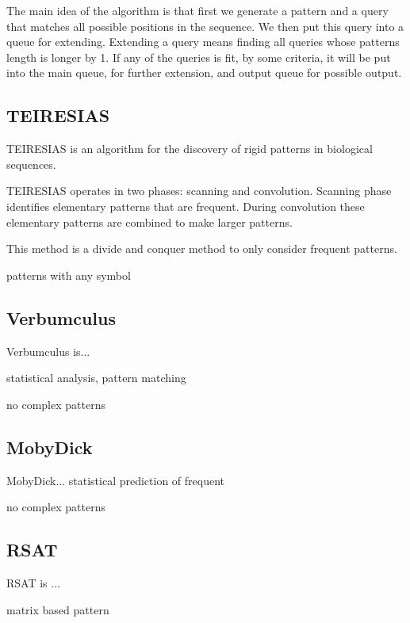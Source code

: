 The main idea of the algorithm is that first we generate a 
pattern and a query that matches all possible positions in 
the sequence. We then put this query into a queue for extending.
Extending a query means finding all queries whose patterns length
is longer by 1. If any of the queries is fit, by some criteria,
it will be put into the main queue, for further extension, 
and output queue for possible output.

\subsection{TEIRESIAS}

TEIRESIAS\cite{TEIRESIAS} is an algorithm for the discovery of rigid patterns in biological sequences. 

TEIRESIAS operates in two phases: scanning and convolution. Scanning phase identifies elementary patterns that are frequent. During convolution these elementary patterns are combined to make larger patterns.

This method is a divide and conquer method to only consider frequent patterns.

patterns with any symbol 


\subsection{Verbumculus}

Verbumculus\cite{Verbumculus} is...

statistical analysis, pattern matching

no complex patterns


\subsection{MobyDick}

MobyDick\cite{MobyDick}...
statistical prediction of frequent

no complex patterns


\subsection{RSAT}

RSAT\cite{RSAT} is ...

matrix based pattern

